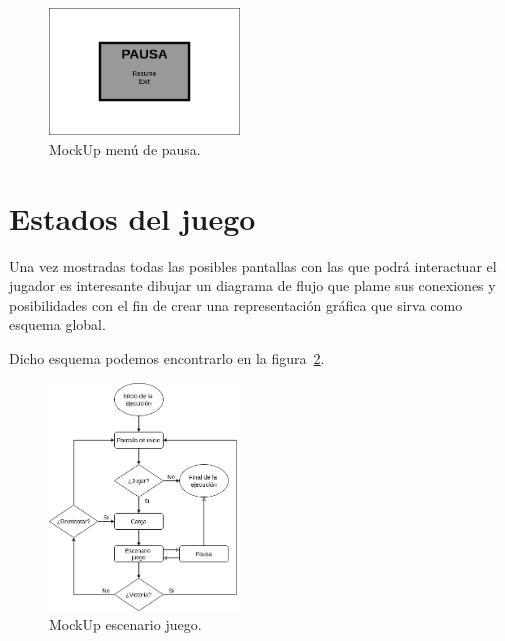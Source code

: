 \begin{figure}[ht]
\centering
\includegraphics[width=0.45\textwidth]{imagenes/Pantalla_pausa.png}
\caption{MockUp menú de pausa.}
\label{mockup_pausa}
\end{figure}

\section{Estados del juego}

Una vez mostradas todas las posibles pantallas con las que podrá interactuar el jugador
es interesante dibujar un diagrama de flujo que plame sus conexiones y posibilidades
con el fin de crear una representación gráfica que sirva como esquema global.

Dicho esquema podemos encontrarlo en la figura~\ref{esq:flow_juego}.
\begin{figure}[ht]
\centering
\includegraphics[width=0.45\textwidth]{imagenes/flow_ejecucion.png}
\caption{MockUp escenario juego.}
\label{esq:flow_juego}
\end{figure}